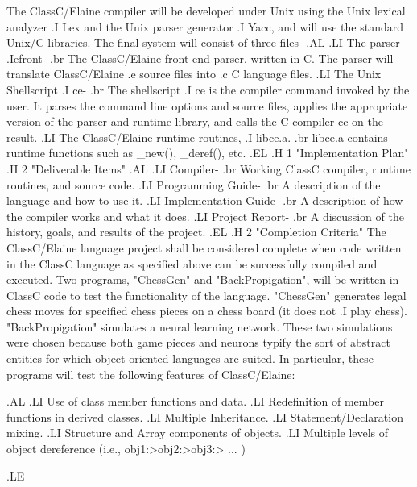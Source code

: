 The ClassC/Elaine compiler will be developed under Unix using the Unix
lexical analyzer
.I Lex
and the Unix parser generator
.I Yacc,
and will use the standard Unix/C libraries.  The final system will consist
of three files-
.AL
.LI
The parser
.Iefront-
.br
The ClassC/Elaine front end parser, written in C.  The parser will translate
ClassC/Elaine .e source files into .c C language files.
.LI
The Unix Shellscript
.I ce-
.br
The shellscript
.I ce
is the compiler command invoked by the user.  It parses the command line
options and source files, applies the appropriate version of the parser
and runtime library, and calls the C compiler cc on the result.
.LI
The ClassC/Elaine runtime routines,
.I libce.a.
.br
libce.a contains runtime functions such as _new(), _deref(), etc.
.EL
.H 1 "Implementation Plan"
.H 2 "Deliverable Items"
.AL
.LI
Compiler-
.br
Working ClassC compiler, runtime routines, and source code.
.LI
Programming Guide-
.br
A description of the language and how to use it.
.LI
Implementation Guide-
.br
A description of how the compiler works and what it does.
.LI
Project Report-
.br
A discussion of the history, goals, and results of the project.
.EL
.H 2 "Completion Criteria"
The ClassC/Elaine language project shall be considered complete when
code written in the ClassC language as specified above can be successfully
compiled and executed.  Two programs, "ChessGen" and "BackPropigation", will
be written in ClassC code to test the functionality of the language.
"ChessGen" generates legal chess moves for specified chess pieces on
a chess board (it does not
.I play
chess).  "BackPropigation" simulates a neural learning network.  These two
simulations were chosen because both game pieces and neurons typify the
sort of abstract entities for which object oriented languages are suited.
In particular, these programs will test the following features of ClassC/Elaine:

.AL
.LI
Use of class member functions and data.
.LI
Redefinition of member functions in derived classes.
.LI
Multiple Inheritance.
.LI
Statement/Declaration mixing.
.LI
Structure and Array components of objects.
.LI
Multiple levels of object dereference (i.e., obj1:>obj2:>obj3:> ... )

.LE


